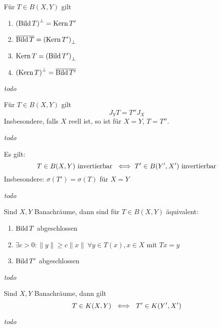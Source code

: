 \begin{prop}
	Für $T \in B(X, Y)$ gilt
	\begin{enumerate}[label=(\roman*\upshape)]
		\item $\left( \mathop{\rm Bild}\nolimits T \right)^{\bot} = \mathop{\rm Kern}\nolimits T'$
		\item $\overline{\mathop{\rm Bild}\nolimits T} = \left( \mathop{\rm Kern}\nolimits T' \right)_{\bot}$
		\item $\mathop{\rm Kern}\nolimits T = \left( \mathop{\rm Bild}\nolimits T' \right)_{\bot}$
		\item $\left( \mathop{\rm Kern}\nolimits T \right)^{\bot} = \overline{\mathop{\rm Bild}\nolimits T'}$
	\end{enumerate}
\end{prop}

\begin{beweis}
	\textit{todo} %
\end{beweis}


\begin{prop}
	Für $T \in B(X, Y)$ gilt
	\[ J_{Y} T = T'' J_{X} \]
	Insbesondere, falls $X$ reell ist, so ist für $X = Y$, $T = T''$.
\end{prop}

\begin{beweis}
	\textit{todo} %
\end{beweis}


\begin{satz}
	Es gilt:
	\[ T \in B(X, Y) \text{ invertierbar } \iff T' \in B(Y', X') \text{ invertierbar} \]
	Insbesondere: $\sigma(T') = \sigma(T)$ für $X = Y$
\end{satz}

\begin{beweis}
	\textit{todo} %
\end{beweis}


\begin{satz} 
	Sind $X, Y$ Banachräume, dann sind für $T \in B(X, Y)$  äquivalent:
	\begin{enumerate}[label=(\roman*\upshape)]
		\item $\mathop{\rm Bild}\nolimits T$ abgeschlossen
		\item $\exists c > 0 : \| y \| \geq c \| x \| ~ \forall y \in T(x), x \in X$ mit $T x = y$
		\item $\mathop{\rm Bild}\nolimits T'$ abgeschlossen
	\end{enumerate}
\end{satz}

\begin{beweis}
	\textit{todo} %
\end{beweis}


\begin{satz}[Schauder] 
	Sind $X, Y$ Banachräume, dann gilt
	\[ T \in K(X, Y) ~ \iff ~ T' \in K(Y', X') \]
\end{satz}

\begin{beweis}
	\textit{todo} %
\end{beweis}


\newpage
